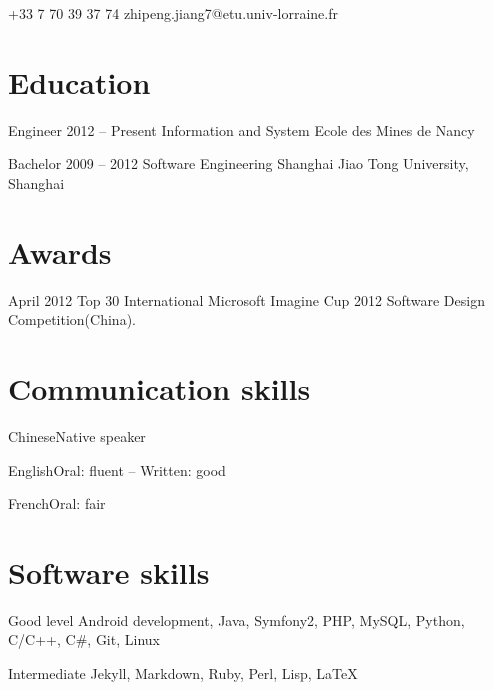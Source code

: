 \documentclass{tccv}
\begin{document}
    {+33 7 70 39 37 74}
    {zhipeng.jiang7@etu.univ-lorraine.fr}

\section{Education}

\begin{yearlist}

\item[Engineer]{2012 -- Present}
     {Information and System}
     {Ecole des Mines de Nancy}

\item[Bachelor]{2009 -- 2012}
     {Software Engineering}
     {Shanghai Jiao Tong University, Shanghai}

\end{yearlist}

\section{Awards}

\begin{yearlist}

\item{April 2012}
     {Top 30}
     {International Microsoft Imagine Cup 2012 Software Design Competition(China).}

\end{yearlist}

\section{Communication skills}

\begin{factlist}
\item{Chinese}{Native speaker}
\item{English}{Oral: fluent -- Written: good}
\item{French}{Oral: fair}
\end{factlist}

\section{Software skills}

\begin{factlist}

\item{Good level}
     {Android development, Java, Symfony2, PHP, MySQL, Python, C/C++, C\#, Git, Linux}

\item{Intermediate}
     {Jekyll, Markdown, Ruby, Perl, Lisp, LaTeX}

\end{factlist}
\end{document}
